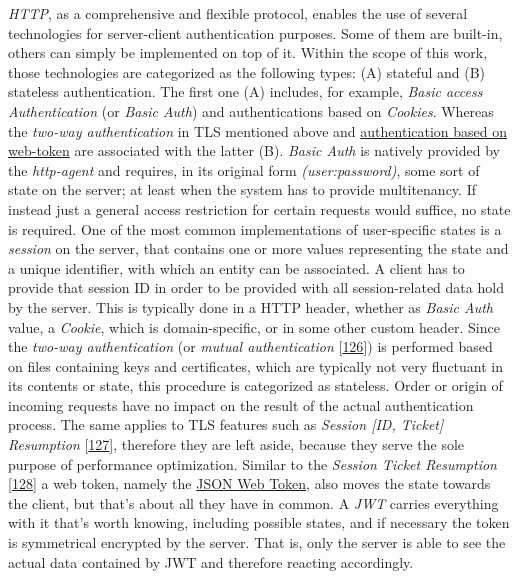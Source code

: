 \documentclass[12pt,english,a4paper,titlepage,cleardoublepage=empty,dottedtoc]{report}
\begin{document}
\emph{HTTP}, as a comprehensive and flexible protocol, enables the use
of several technologies for server-client authentication purposes. Some
of them are built-in, others can simply be implemented on top of it.
Within the scope of this work, those technologies are categorized as the
following types: (A) stateful and (B) stateless authentication. The
first one (A) includes, for example, \emph{Basic access Authentication}
(or \emph{Basic Auth}) and authentications based on \emph{Cookies}.
Whereas the \emph{two-way authentication} in TLS mentioned above and
\protect\hyperlink{def--jwt}{authentication based on web-token} are
associated with the latter (B). \emph{Basic Auth} is natively provided
by the \emph{http-agent} and requires, in its original form
\emph{(user:password)}, some sort of state on the server; at least when
the system has to provide multitenancy. If instead just a general access
restriction for certain requests would suffice, no state is required.
One of the most common implementations of user-specific states is a
\emph{session} on the server, that contains one or more values
representing the state and a unique identifier, with which an entity can
be associated. A client has to provide that session ID in order to be
provided with all session-related data hold by the server. This is
typically done in a HTTP header, whether as \emph{Basic Auth} value, a
\emph{Cookie}, which is domain-specific, or in some other custom header.
Since the \emph{two-way authentication} (or \emph{mutual authentication}
{[}\protect\hyperlink{ref-web_2017_wikipedia_mutual-auth}{126}{]}) is
performed based on files containing keys and certificates, which are
typically not very fluctuant in its contents or state, this procedure is
categorized as stateless. Order or origin of incoming requests have no
impact on the result of the actual authentication process. The same
applies to TLS features such as \emph{Session {[}ID, Ticket{]}
Resumption}
{[}\protect\hyperlink{ref-book_2013_networking-101_tls-session-resumption}{127}{]},
therefore they are left aside, because they serve the sole purpose of
performance optimization. Similar to the \emph{Session Ticket
Resumption}
{[}\protect\hyperlink{ref-web_spec_tls-session-ticket-resumption}{128}{]}
a web token, namely the \protect\hyperlink{def--jwt}{JSON Web Token},
also moves the state towards the client, but that's about all they have
in common. A \emph{JWT} carries everything with it that's worth knowing,
including possible states, and if necessary the token is symmetrical
encrypted by the server. That is, only the server is able to see the
actual data contained by JWT and therefore reacting accordingly.
\end{document}
